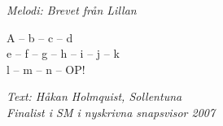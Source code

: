 {\footnotesize\textit{Melodi:  Brevet från Lillan}}\par
\vspace{10pt}
A – b – c – d\\
e – f – g – h – i – j – k\\
l – m – n – OP!\par
\vspace{10pt}
{\footnotesize\textit{Text: Håkan Holmquist, Sollentuna\\Finalist i SM i nyskrivna snapsvisor 2007}}
